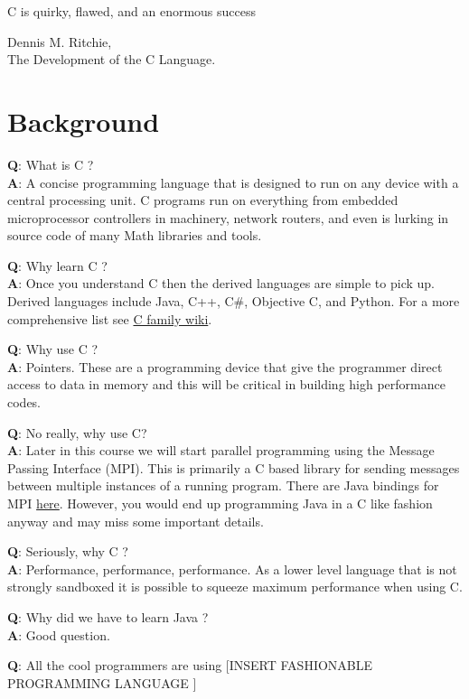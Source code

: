 
\epigraph{C is quirky, flawed, and an enormous success}{Dennis M. Ritchie, \\The Development of the C Language.}

\minitoc

\section{Background}
{\bf Q}: What is C ? \\
{\bf A}: A concise programming language that is designed to run on any device with a central processing unit. C programs run on everything from embedded microprocessor controllers in machinery,  network routers, and even is lurking in source code of many Math libraries and tools. 

{\bf Q}: Why learn C ? \\
{\bf A}: Once you understand C then the derived languages are simple to pick up. Derived languages include Java, C++, C\#, Objective C, and Python. For a more comprehensive list see \href{https://en.wikipedia.org/wiki/List_of_C-family_programming_languages}{C family wiki}.

{\bf Q}: Why use C ? \\
{\bf A}: Pointers. These are a programming device that give the programmer direct access to data in memory and this will be critical in building high performance codes.

{\bf Q}: No really, why use C? \\
{\bf A}: Later in this course we will start parallel programming using the Message Passing Interface (MPI). This is primarily a C based library for sending messages between multiple instances of a running program. There are Java bindings for MPI \href{https://www.open-mpi.org/faq/?category=java}{here}. However, you would end up programming Java in a C like fashion anyway and may miss some important details.

{\bf Q}: Seriously, why C ? \\
{\bf A}: Performance, performance, performance. As a lower level language that is not strongly sandboxed it is possible to squeeze maximum performance when using C.

{\bf Q}: Why did we have to learn Java ?\\
{\bf A}: Good question.

{\bf Q}: All the cool programmers are using [INSERT FASHIONABLE PROGRAMMING LANGUAGE ]\\

